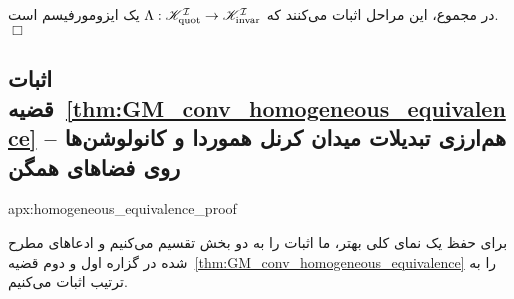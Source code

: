 \noindent در مجموع، این مراحل اثبات می‌کنند که $\Lambda: \mathscr{K}_\textup{quot}^{\mathcal{I}} \to \mathscr{K}_\textup{invar}^{\mathcal{I}}$ یک ایزومورفیسم است.
\hfill$\Box$







\toclesslab\subsection{اثبات قضیه~\ref{thm:GM_conv_homogeneous_equivalence} -- هم‌ارزی تبدیلات میدان کرنل هموردا و کانولوشن‌ها روی فضاهای همگن}{apx:homogeneous_equivalence_proof}

برای حفظ یک نمای کلی بهتر، ما اثبات را به دو بخش تقسیم می‌کنیم و ادعاهای مطرح شده در گزاره اول و دوم قضیه~\ref{thm:GM_conv_homogeneous_equivalence} را به ترتیب اثبات می‌کنیم.

